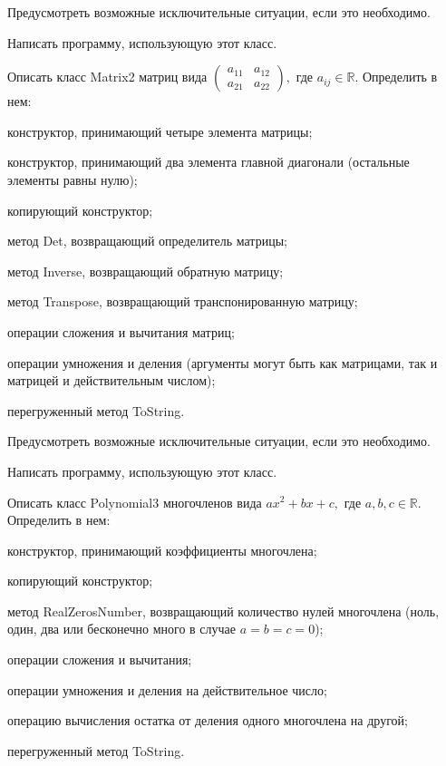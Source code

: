 Предусмотреть возможные исключительные ситуации, если это необходимо.

Написать программу, использующую этот класс.

\task Описать класс Matrix2 матриц вида
$\begin{pmatrix}
a_{11} & a_{12} \\
a_{21} & a_{22}
\end{pmatrix},$ где $a_{ij} \in \mathbb{R}$. Определить в нем:
\begin{itemize*}
\item конструктор, принимающий четыре элемента матрицы;
\item конструктор, принимающий два элемента главной диагонали
  (остальные элементы равны нулю);
\item копирующий конструктор;
\item метод Det, возвращающий определитель матрицы;
\item метод Inverse, возвращающий обратную матрицу;
\item метод Transpose, возвращающий транспонированную матрицу;
\item операции сложения и вычитания матриц;
\item операции умножения и деления (аргументы могут быть как матрицами,
  так и матрицей и действительным числом);
\item перегруженный метод ToString.
\end{itemize*}

Предусмотреть возможные исключительные ситуации, если это необходимо.

Написать программу, использующую этот класс.

\task Описать класс Polynomial3 многочленов вида $ax^2+bx+c,$ где
$a,b,c \in \mathbb{R}$. Определить в нем:
\begin{itemize*}
\item конструктор, принимающий коэффициенты многочлена;
\item копирующий конструктор;
\item метод RealZerosNumber, возвращающий количество нулей многочлена
  (ноль, один, два или бесконечно много в случае $a=b=c=0$);
\item операции сложения и вычитания;
\item операции умножения и деления на действительное число;
\item операцию вычисления остатка от деления одного многочлена на
  другой;
\item перегруженный метод ToString.
\end{itemize*}

